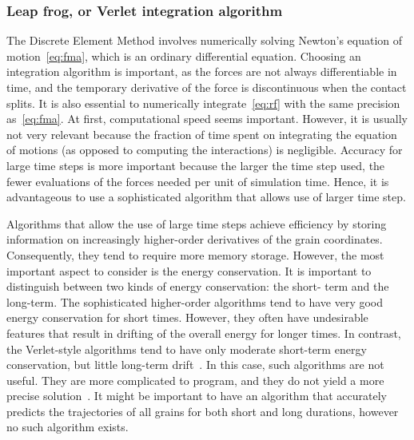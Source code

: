 \subsubsection{Leap frog, or Verlet integration algorithm}

The Discrete Element Method involves numerically solving Newton's equation of 
motion~\cref{eq:fma}, which is an ordinary differential equation. Choosing an 
integration algorithm is important, as the forces are not always differentiable 
in time, and the temporary derivative of the force is discontinuous when the 
contact splits. It is also essential to numerically integrate~\cref{eq:rf} 
with the same precision as~\cref{eq:fma}. At first, computational speed seems 
important. However, it is usually not very relevant because the fraction of 
time spent on integrating the equation of motions (as opposed to computing the 
interactions) is negligible. Accuracy for large time steps is more important 
because the larger the time step used, the fewer evaluations of the forces 
needed per unit of simulation time. Hence, it is advantageous to use a 
sophisticated algorithm that allows use of larger time step. 

Algorithms that allow the use of large time steps achieve efficiency by storing 
information on increasingly higher-order derivatives of the 
grain coordinates. Consequently, they tend to require more memory storage. 
However, the most important aspect to consider is the energy conservation. It 
is important to distinguish between two kinds of energy conservation: the short-
term and the long-term. The sophisticated higher-order algorithms tend to have 
very good energy conservation for short times. However, they often have 
undesirable features that result in drifting of the overall energy for longer 
times. In contrast, the Verlet-style algorithms tend to have only moderate 
short-term energy conservation, but little long-term drift~\citep{Frenkel1996}. 
In this case, such algorithms are not useful. They are more complicated to 
program, and they do not yield a more precise solution~\citep{Radjai2011}. It 
might be important to have an algorithm that accurately predicts the 
trajectories of all grains for both short and long durations, however no such 
algorithm exists.


